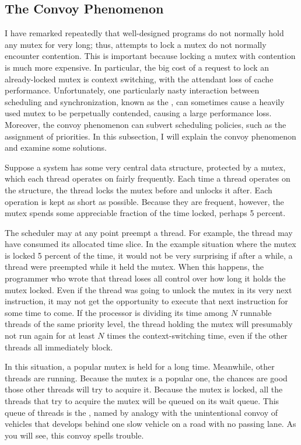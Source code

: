 \subsection{The Convoy Phenomenon}\label{convoy-section}

I have remarked repeatedly that well-designed programs do not
normally hold any mutex for very long; thus, attempts to lock a mutex
do not normally encounter contention.  This is important because
locking a mutex with contention is much more expensive.  In
particular, the big cost of a request to lock an already-locked mutex
is context switching, with the attendant loss of cache performance.
Unfortunately, one particularly nasty interaction between scheduling
and synchronization, known as the , can sometimes
cause a heavily used mutex to be perpetually contended, causing a
large performance loss.  Moreover, the convoy phenomenon can subvert
scheduling policies, such as the assignment of priorities. In this
subsection, I will explain the convoy phenomenon and examine some
solutions.

Suppose a system has some very central data structure, protected by a
mutex, which each thread operates on fairly frequently.  Each time a
thread operates on the structure, the thread locks the mutex before
and unlocks it after.  Each operation is kept as short as possible.
Because they are frequent, however, the mutex spends some appreciable
fraction of the time locked, perhaps 5 percent.

The scheduler may at any point preempt a thread.  For example, the
thread may have consumed its allocated time slice.  In the example
situation where the mutex is locked 5 percent of the time, it would not be
very surprising if after a while, a thread were preempted while it
held the mutex.  When this happens, the programmer who wrote that
thread loses all control over how long it holds the mutex locked.
Even if the thread was going to unlock the mutex in its very next
instruction, it may not get the opportunity to execute that next
instruction for some time to come.  If the processor is dividing its
time among $N$ runnable threads of the same priority level, the thread
holding the mutex will presumably not run again for at least $N$ times
the context-switching time, even if the other threads all immediately
block.

In this situation, a popular mutex is held for a long time.
Meanwhile, other threads are running.  Because the mutex is a popular
one, the chances are good those other threads will try to acquire it.
Because the mutex is locked, all the threads that try to acquire the mutex will be queued on
its wait queue.  This queue of threads is the , named by
analogy with the unintentional convoy of vehicles that develops behind
one slow vehicle on a road with no passing lane.  As you will see,
this convoy spells trouble.

